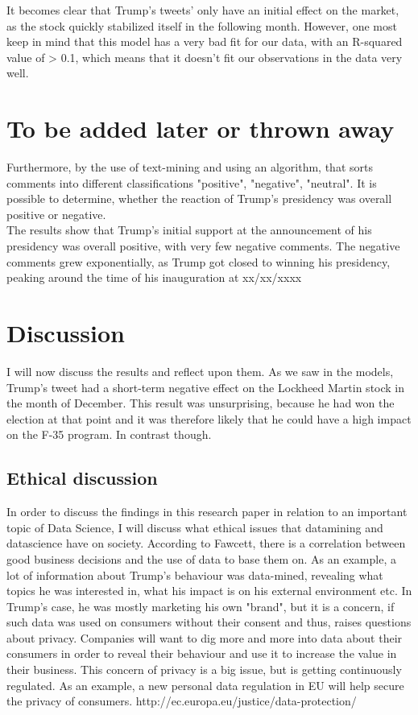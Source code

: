 \documentclass[11pt]{article}
\begin{document}
It becomes clear that Trump's tweets' only have an initial effect on the market, as the stock quickly stabilized itself in the following month. However, one most keep in mind that this model has a very bad fit for our data, with an R-squared value of > 0.1, which means that it doesn't fit our observations in the data very well. 




\section{To be added later or thrown away}

Furthermore, by the use of text-mining and using an algorithm, that sorts comments into different classifications "positive", "negative", "neutral". It is possible to determine, whether the reaction of Trump's presidency was overall positive or negative. \\

The results show that Trump's initial support at the announcement of his presidency was overall positive, with very few negative comments.  The negative comments grew exponentially, as Trump got closed to winning his presidency, peaking around the time of his inauguration at xx/xx/xxxx


\section{Discussion}
I will now discuss the results and reflect upon them. As we saw in the models, Trump's tweet had a short-term negative effect on the Lockheed Martin stock in the month of December. This result was unsurprising, because he had won the election at that point and it was therefore likely that he could have a high impact on the F-35 program. In contrast though.

\subsection{Ethical discussion}

In order to discuss the findings in this research paper in relation to an important topic of Data Science, I will discuss what ethical issues that datamining and datascience have on society. According to Fawcett, there is a correlation between good business decisions and the use of data to base them on. As an example, a lot of information about Trump's behaviour was data-mined, revealing what topics he was interested in, what his impact is on his external environment etc. In Trump's case, he was mostly marketing his own "brand", but it is a concern, if such data was used on consumers without their consent and thus, raises questions about privacy. Companies will want to dig more and more into data about their consumers in order to reveal their behaviour and use it to increase the value in their business. This concern of privacy is a big issue, but is getting continuously regulated. As an example, a new personal data regulation in EU will help secure the privacy of consumers. http://ec.europa.eu/justice/data-protection/
\end{document}
